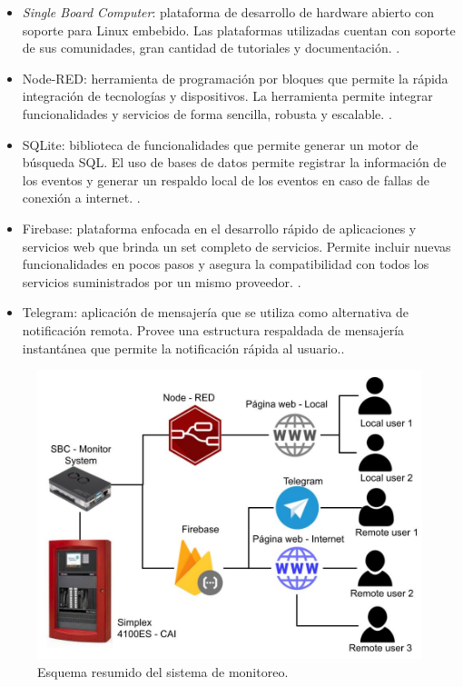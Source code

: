 \begin{itemize}
\item \textit{Single Board Computer}: plataforma de desarrollo de hardware abierto con soporte para Linux embebido. Las plataformas utilizadas cuentan con soporte de sus comunidades, gran cantidad de tutoriales y documentación. \citep{bbb}.
\item Node-RED: herramienta de programación por bloques que permite la rápida integración de tecnologías y dispositivos. La herramienta permite integrar funcionalidades y servicios de forma sencilla, robusta y escalable. \citep{nodered}.
\item SQLite: biblioteca de funcionalidades que permite generar un motor de búsqueda SQL. El uso de bases de datos permite registrar la información de los eventos y generar un respaldo local de los eventos en caso de fallas de conexión a internet. \citep{sqlite}.
\item Firebase: plataforma enfocada en el desarrollo rápido de aplicaciones y servicios web que brinda un set completo de servicios. Permite incluir nuevas funcionalidades en pocos pasos y asegura la compatibilidad con todos los servicios suministrados por un mismo proveedor. \citep{fbase}.
\item Telegram: aplicación de mensajería que se utiliza como alternativa de notificación remota. Provee una estructura respaldada de mensajería instantánea que permite la notificación rápida al usuario.\citep{telegram}.
\end{itemize}


\begin{figure}[ht]
   \centering
   \includegraphics[scale=.35]{./Figures/modulo.jpg}
   \caption{Esquema resumido del sistema de monitoreo.}
   \label{fig:modulo}
\end{figure}


